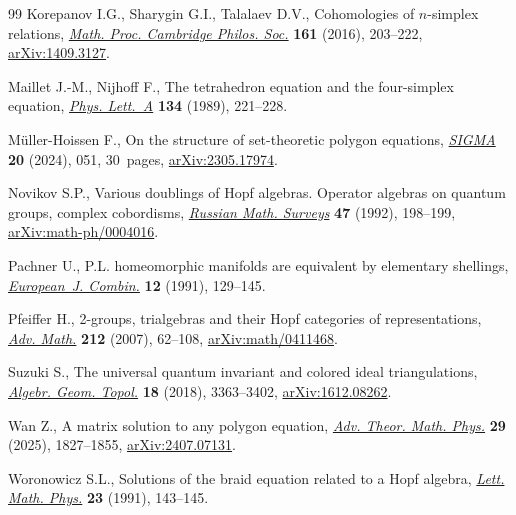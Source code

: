 \documentclass[pdftex]{sigma}
\numberwithin{equation}{section}
\theoremstyle{definition}
\begin{document}
\begin{thebibliography}{99}
Korepanov I.G., Sharygin G.I., Talalaev D.V., Cohomologies of {$n$}-simplex
 relations, \href{https://doi.org/10.1017/S030500411600030X}{\textit{Math.
 Proc. Cambridge Philos. Soc.}} \textbf{161} (2016), 203--222,
 \href{https://arxiv.org/abs/1409.3127}{arXiv:1409.3127}.

Maillet J.-M., Nijhoff F., The tetrahedron equation and the four-simplex
 equation, \href{https://doi.org/10.1016/0375-9601(89)90400-3}{\textit{Phys.
 Lett.~A}} \textbf{134} (1989), 221--228.

M\"{u}ller-Hoissen F., On the structure of set-theoretic polygon equations,
 \href{https://doi.org/10.3842/SIGMA.2024.051}{\textit{SIGMA}} \textbf{20}
 (2024), 051, 30~pages,
 \href{https://arxiv.org/abs/2305.17974}{arXiv:2305.17974}.

Novikov S.P., Various doublings of {H}opf algebras. {O}perator algebras on
 quantum groups, complex cobordisms,
 \href{https://doi.org/10.1070/RM1992v047n05ABEH000957}{\textit{Russian Math.
 Surveys}} \textbf{47} (1992), 198--199,
 \href{https://arxiv.org/abs/math-ph/0004016}{arXiv:math-ph/0004016}.

Pachner U., P.{L}. homeomorphic manifolds are equivalent by elementary
 shellings,
 \href{https://doi.org/10.1016/S0195-6698(13)80080-7}{\textit{European~J.
 Combin.}} \textbf{12} (1991), 129--145.

Pfeiffer H., 2-groups, trialgebras and their {H}opf categories of
 representations,
 \href{https://doi.org/10.1016/j.aim.2006.09.014}{\textit{Adv. Math.}}
 \textbf{212} (2007), 62--108,
 \href{https://arxiv.org/abs/math/0411468}{arXiv:math/0411468}.

Suzuki S., The universal quantum invariant and colored ideal triangulations,
 \href{https://doi.org/10.2140/agt.2018.18.3363}{\textit{Algebr. Geom.
 Topol.}} \textbf{18} (2018), 3363--3402,
 \href{https://arxiv.org/abs/1612.08262}{arXiv:1612.08262}.

Wan Z., A matrix solution to any polygon equation,
 \href{https://doi.org/10.4310/atmp.251120034604}{\textit{Adv. Theor. Math.
 Phys.}} \textbf{29} (2025), 1827--1855,
 \href{https://arxiv.org/abs/2407.07131}{arXiv:2407.07131}.

Woronowicz S.L., Solutions of the braid equation related to a {H}opf algebra,
 \href{https://doi.org/10.1007/BF00703727}{\textit{Lett. Math. Phys.}}
 \textbf{23} (1991), 143--145.


\end{thebibliography}
\end{document}
